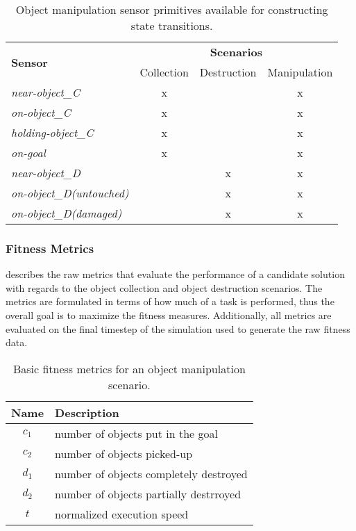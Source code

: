 \begin{table}[ht]
  \centering
  \begin{tabular}{|l||c|c|c|}
    \hline
	\multirow{2}{*}{\textbf{Sensor}} & \multicolumn{3}{c|}{\textbf{Scenarios}}  \\
       & Collection & Destruction & Manipulation \\
    \hline
    \hline
    \emph{near-object\_C}          & x &   & x \\
    \emph{on-object\_C}            & x &   & x \\
    \emph{holding-object\_C}       & x &   & x \\
    \emph{on-goal}                 & x &   & x \\
    \hline
    \emph{near-object\_D}          &   & x & x \\
    \emph{on-object\_D(untouched)} &   & x & x \\
    \emph{on-object\_D(damaged)}   &   & x & x \\
    \hline
  \end{tabular}
  \caption{Object manipulation sensor primitives available for constructing state transitions.}
  \label{tab:ObjectSensors}
\end{table}

\subsubsection{Fitness Metrics}

 describes the raw metrics that evaluate the performance of a candidate solution with regards to the object collection and object destruction scenarios.  The metrics are formulated in terms of how much of a task is performed, thus the overall goal is to maximize the fitness measures.  Additionally, all metrics are evaluated on the final timestep of the \SWEEP{} simulation used to generate the raw fitness data.

\begin{table}[ht]
  \centering
  \begin{tabular}{|c|l|}
    \hline
    Name & Description \\
    \hline
    $c_{1}$ & number of objects put in the goal      \\
    $c_{2}$ & number of objects picked-up            \\
    $d_{1}$ & number of objects completely destroyed \\
    $d_{2}$ & number of objects partially destrroyed \\
    $t$     & normalized execution speed             \\
    \hline
  \end{tabular}
  
\caption{Basic fitness metrics for an object manipulation scenario.}
\label{tab:ObjectMetrics}
\end{table}


